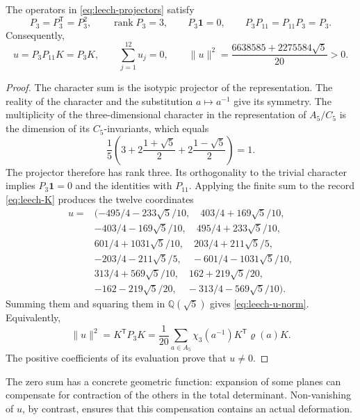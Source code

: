 \begin{lemma}
\label{lem:leech-u}
The operators in \eqref{eq:leech-projectors} satisfy
\[
 P_3=P_3^{\mathsf T}=P_3^2,\qquad
 \operatorname{rank}P_3=3,\qquad P_3\mathbf1=0,\qquad
 P_3P_{11}=P_{11}P_3=P_3.
\]
Consequently,
\begin{equation}
 u=P_3P_{11}K=P_3K,\qquad
 \sum_{j=1}^{12}u_j=0,\qquad
 \|u\|^2=\frac{6638585+2275584\sqrt5}{20}>0.
 \label{eq:leech-u-norm}
\end{equation}
\end{lemma}
\begin{proof}
The character sum is the isotypic projector of the representation.
The reality of the character and the substitution \(a\mapsto a^{-1}\)
give its symmetry. The multiplicity of the three-dimensional character in the
representation of \(A_5/C_5\) is the dimension of its
\(C_5\)-invariants, which equals
\[
 \frac15\left(
 3+2\frac{1+\sqrt5}{2}+2\frac{1-\sqrt5}{2}
 \right)=1.
\]
The projector therefore has rank three. Its orthogonality to the trivial
character implies \(P_3\mathbf1=0\) and the identities with \(P_{11}\).
Applying the finite sum to the record
\eqref{eq:leech-K} produces the twelve coordinates
\begin{equation}
\begin{aligned}
u={}&(-495/4-233\sqrt5/10,\quad403/4+169\sqrt5/10,\\
&-403/4-169\sqrt5/10,\quad495/4+233\sqrt5/10,\\
&601/4+1031\sqrt5/10,\quad203/4+211\sqrt5/5,\\
&-203/4-211\sqrt5/5,\quad-601/4-1031\sqrt5/10,\\
&313/4+569\sqrt5/10,\quad162+219\sqrt5/20,\\
&-162-219\sqrt5/20,\quad-313/4-569\sqrt5/10).
\end{aligned}
\label{eq:leech-u-coordinates}
\end{equation}
Summing them and squaring them in \(\mathbb Q(\sqrt5)\) gives
\eqref{eq:leech-u-norm}. Equivalently,
\[
 \|u\|^2=K^{\mathsf T}P_3K
 =\frac1{20}\sum_{a\in A_5}
          \chi_3(a^{-1})K^{\mathsf T}\varrho(a)K.
\]
The positive coefficients of its evaluation prove that \(u\ne0\).
\end{proof}

The zero sum has a concrete geometric function: expansion of
some planes can compensate for contraction of the others in the
total determinant. Non-vanishing of \(u\), by contrast, ensures that this
compensation contains an actual deformation.

